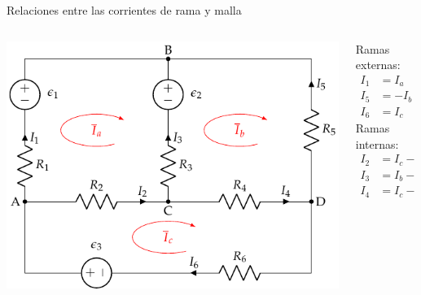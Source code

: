 \documentclass[xcolor={usenames,svgnames,dvipsnames}]{beamer}
\begin{document}
\begin{frame}[label={sec:org5df88c3}]{Relaciones entre las corrientes de rama y malla}
\begin{columns}
\begin{column}{0.6\columnwidth}
\begin{center}
\includegraphics[width=.9\linewidth]{figs/mallas1_corrientes.pdf}
\end{center}
\end{column}
\begin{column}{0.4\columnwidth}
Ramas externas:
\begin{align*}
  I_1 &= I_a\\
  I_5 &= -I_b\\
  I_6 &= I_c
\end{align*}
Ramas internas:
\begin{align*}
  I_2 &= I_c -I_a\\
  I_3 &= I_b - I_a\\
  I_4 &= I_c - I_b
\end{align*}
\end{column}
\end{columns}
\end{frame}
\end{document}
